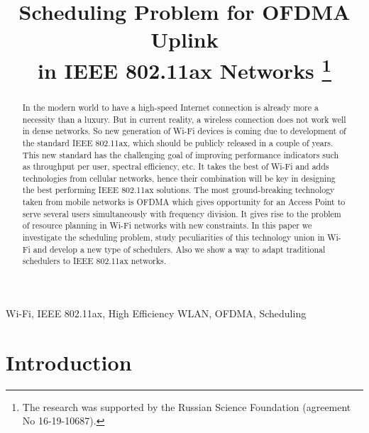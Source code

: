 
%


\IEEEoverridecommandlockouts

\title{%
Scheduling Problem for OFDMA Uplink \\in IEEE 802.11ax Networks
\thanks{The research was supported by the Russian Science Foundation (agreement No 16-19-10687).}}

\author{
}

\maketitle

\begin{abstract}
In the modern world to have a high-speed Internet connection is already more a necessity than a luxury. 
But in current reality, a wireless connection does not work well in dense networks. 
So new generation of Wi-Fi devices is coming due to development of the standard IEEE 802.11ax, which should be publicly released in a couple of years. 
This new standard has the challenging goal of improving performance indicators such as throughput per user, spectral efficiency, etc. 
It takes the best of Wi-Fi and adds technologies from cellular networks, hence their combination will be key in designing the best performing IEEE 802.11ax solutions.
The most ground-breaking technology taken from mobile networks is OFDMA which gives opportunity for an Access Point to serve several users simultaneously with frequency division. 
It gives rise to the problem of resource planning in Wi-Fi networks with new constraints.
In this paper we investigate the scheduling problem, study peculiarities of this technology union in Wi-Fi and develop a new type of schedulers.
Also we show a way to adapt traditional schedulers to  IEEE 802.11ax networks.
\end{abstract}

\begin{IEEEkeywords}
Wi-Fi, IEEE 802.11ax, High Efficiency WLAN, OFDMA, Scheduling
\end{IEEEkeywords}

\section{Introduction}


